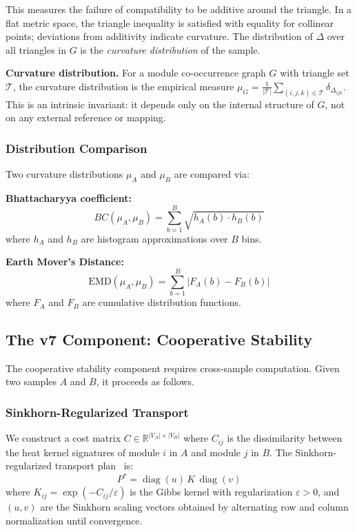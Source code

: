 \documentclass{../yalumba}
\begin{document}
This measures the failure of compatibility to be additive around the
triangle.  In a flat metric space, the triangle inequality is satisfied
with equality for collinear points; deviations from additivity indicate
curvature.  The distribution of $\Delta$ over all triangles in $G$ is the
\emph{curvature distribution} of the sample.

\begin{definition}
\textbf{Curvature distribution.}  For a module co-occurrence graph $G$
with triangle set $\mathcal{T}$, the curvature distribution is the
empirical measure $\mu_G = \frac{1}{|\mathcal{T}|} \sum_{(i,j,k) \in
\mathcal{T}} \delta_{\Delta_{ijk}}$.  This is an intrinsic invariant:
it depends only on the internal structure of $G$, not on any external
reference or mapping.
\end{definition}

\subsubsection{Distribution Comparison}

Two curvature distributions $\mu_A$ and $\mu_B$ are compared via:

\textbf{Bhattacharyya coefficient:}
\begin{equation}
BC(\mu_A, \mu_B) = \sum_{b=1}^{B} \sqrt{h_A(b) \cdot h_B(b)}
\label{eq:bhattacharyya}
\end{equation}
where $h_A$ and $h_B$ are histogram approximations over $B$ bins.

\textbf{Earth Mover's Distance:}
\begin{equation}
\text{EMD}(\mu_A, \mu_B) = \sum_{b=1}^{B} \left|F_A(b) - F_B(b)\right|
\label{eq:emd}
\end{equation}
where $F_A$ and $F_B$ are cumulative distribution functions.

\subsection{The v7 Component: Cooperative Stability}

The cooperative stability component requires cross-sample computation.
Given two samples $A$ and $B$, it proceeds as follows.

\subsubsection{Sinkhorn-Regularized Transport}

We construct a cost matrix $C \in \mathbb{R}^{|V_A| \times |V_B|}$
where $C_{ij}$ is the dissimilarity between the heat kernel signatures
of module $i$ in $A$ and module $j$ in $B$.  The Sinkhorn-regularized
transport plan~\cite{cuturi2013sinkhorn} is:
\begin{equation}
P^* = \operatorname{diag}(u) \, K \, \operatorname{diag}(v)
\label{eq:sinkhorn}
\end{equation}
where $K_{ij} = \exp(-C_{ij}/\varepsilon)$ is the Gibbs kernel with
regularization $\varepsilon > 0$, and $(u,v)$ are the Sinkhorn scaling
vectors obtained by alternating row and column normalization until
convergence.
\end{document}
